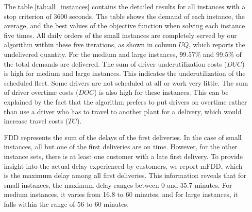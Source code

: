 \documentclass{article}
\begin{document}
The table \ref*{tab:all_instances} contains the detailed results for all instances with a stop criterion of 3600 seconds. The table shows the demand of each instance, the average, and the best values of the objective function when solving each instance five times. All daily orders of the small instances are completely served by our algorithm within these five iterations, as shown in column $UQ$, which reports the undelivered quantity. For the medium and large instances, $99.57\%$ and $99.5\%$ of the total demands are delivered. The sum of driver underutilization costs ($DUC$) is high for medium and large instances. This indicates the underutilization of the scheduled fleet. Some drivers are not scheduled at all or work very little. The sum of driver overtime costs ($DOC$) is also high for these instances. This can be explained by the fact that the algorithm prefers to put drivers on overtime rather than use a driver who has to travel to another plant for a delivery, which would increase travel costs ($TC$).

FDD represents the sum of the delays of the first deliveries. In the case of small instances, all but one of the first deliveries are on time. However, for the other instance sets, there is at least one customer with a late first delivery. To provide insight into the actual delay experienced by customers, we report mFDD, which is the maximum delay among all first deliveries. This information reveals that for small instances, the maximum delay ranges between 0 and 35.7 minutes. For medium instances, it varies from 16.8 to 60 minutes, and for large instances, it falls within the range of 56 to 60 minutes.
\end{document}
